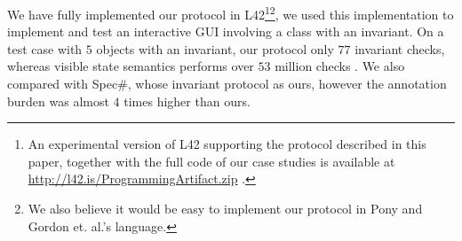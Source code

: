 


We have fully implemented our protocol in L42\footnote{An experimental version of L42 supporting the protocol described in this paper, together with the full code of our case studies is available at \url{http://l42.is/ProgrammingArtifact.zip} .}\footnote{We also believe it would be easy to implement our protocol in Pony and Gordon et. al.'s language.}, we used this implementation to implement and test an interactive GUI involving a class with an invariant. On a test case with $5$ objects with an invariant, 
our protocol  only $77$ invariant checks, whereas visible state semantics performs over $53$ million checks . We also compared with Spec\#, whose invariant protocol  as ours, however the annotation burden was almost $4$ times higher than ours.

